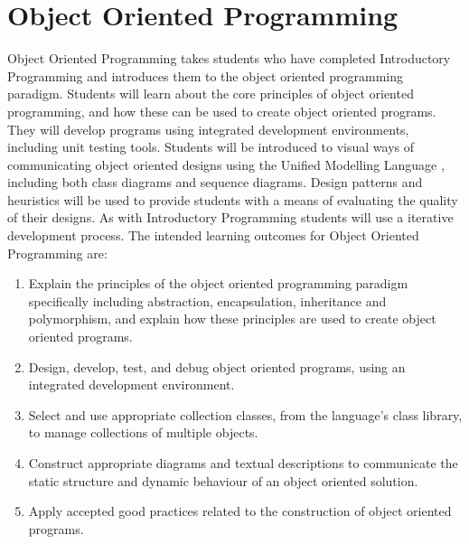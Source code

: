 


\clearpage
\section{Object Oriented Programming} %
\label{sec:object_oriented_programming}





Object Oriented Programming takes students who have completed Introductory Programming and introduces them to the object oriented programming paradigm. Students will learn about the core principles of object oriented programming, and how these can be used to create object oriented programs. They will develop programs using integrated development environments, including  unit testing tools. Students will be introduced to visual ways of communicating object oriented designs using the Unified Modelling Language \cite{Fowler:2004}, including both class diagrams and sequence diagrams. Design patterns and heuristics will be used to provide students with a means of evaluating the quality of their designs. As with Introductory Programming students will use a iterative development process. The intended learning outcomes for Object Oriented Programming are:
\begin{enumerate}
	\item Explain the principles of the object oriented programming paradigm specifically including abstraction, encapsulation, inheritance and polymorphism, and explain how these principles are used to create object oriented programs.
	\item Design, develop, test, and debug object oriented programs, using an integrated development environment.
	\item Select and use appropriate collection classes, from the language's class library, to manage collections of multiple objects.
	\item Construct appropriate diagrams and textual descriptions to communicate the static structure and dynamic behaviour of an object oriented solution.
	\item Apply accepted good practices related to the construction of object oriented programs.
\end{enumerate}



